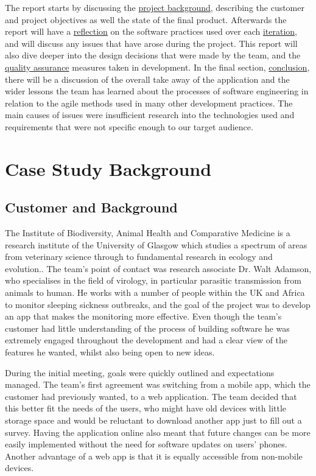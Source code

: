 \documentclass{l3proj}
\begin{document}
The report starts by discussing the \hyperref[sec:background]{project background}, describing the customer and project objectives as well the state of the final product. Afterwards the report will have a \hyperref[sec:reflection]{reflection} on the software practices used over each \hyperref[subsec:iterations]{iteration}, and will discuss any issues that have arose during the project. This report will also dive deeper into the design decisions that were made by the team, and the \hyperref[subsec:qa]{quality assurance} measures taken in development. In the final section, \hyperref[sec:conclusion]{conclusion}, there will be a discussion of the overall take away of the application and the wider lessons the team has learned about the processes of software engineering in relation to the agile methods used in many other development practices. The main causes of issues were insufficient research into the technologies used and requirements that were not specific enough to our target audience.

\section{Case Study Background}
\label{sec:background}

\subsection{Customer and Background}
The Institute of Biodiversity, Animal Health and Comparative Medicine is a research institute of the University of Glasgow which studies a spectrum of areas from veterinary science through to fundamental research in ecology and evolution.\cite{BAHCM}. The team's point of contact was research associate Dr. Walt Adamson, who specialises in the field of virology, in particular parasitic transmission from animals to human. He works with a number of people within the UK and Africa to monitor sleeping sickness outbreaks, and the goal of the project was to develop an app that makes the monitoring more effective. Even though the team's customer had little understanding of the process of building software he was extremely engaged throughout the development and had a clear view of the features he wanted, whilst also being open to new ideas.

During the initial meeting, goals were quickly outlined and expectations managed. The team's first agreement was switching from a mobile app, which the customer had previously wanted, to a web application. The team decided that this better fit the needs of the users, who might have old devices with little storage space and would be reluctant to download another app just to fill out a survey. Having the application online also meant that future changes can be more easily implemented without the need for software updates on users' phones. Another advantage of a web app is that it is equally accessible from non-mobile devices.
\end{document}
